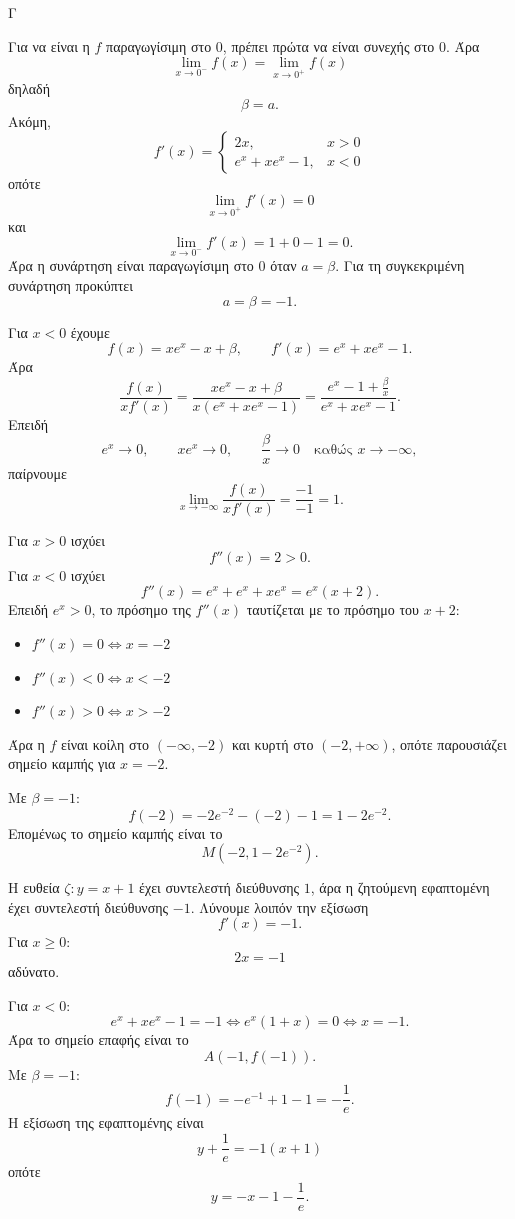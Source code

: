 \begin{thema}{Γ}
\begin{erwthma}
\item Για να είναι η $f$ παραγωγίσιμη στο $0$, πρέπει πρώτα να είναι συνεχής στο $0$.
Άρα
\[
\lim_{x\to 0^-}f(x)=\lim_{x\to 0^+}f(x)
\]
δηλαδή
\[
\beta=a.
\]
Ακόμη,
\[
f'(x)=
\begin{cases}
2x,& x>0\\
e^x+xe^x-1,& x<0
\end{cases}
\]
οπότε
\[
\lim_{x\to 0^+}f'(x)=0
\]
και
\[
\lim_{x\to 0^-}f'(x)=1+0-1=0.
\]
Άρα η συνάρτηση είναι παραγωγίσιμη στο $0$ όταν $a=\beta$.
Για τη συγκεκριμένη συνάρτηση προκύπτει
\[
a=\beta=-1.
\]

\item Για $x<0$ έχουμε
\[
f(x)=xe^x-x+\beta,\qquad f'(x)=e^x+xe^x-1.
\]
Άρα
\[
\frac{f(x)}{xf'(x)}
=
\frac{xe^x-x+\beta}{x(e^x+xe^x-1)}
=
\frac{e^x-1+\frac{\beta}{x}}{e^x+xe^x-1}.
\]
Επειδή
\[
e^x\to 0,\qquad xe^x\to 0,\qquad \frac{\beta}{x}\to 0 \quad \text{καθώς } x\to -\infty,
\]
παίρνουμε
\[
\lim_{x\to -\infty}\frac{f(x)}{xf'(x)}
=
\frac{-1}{-1}=1.
\]

\item Για $x>0$ ισχύει
\[
f''(x)=2>0.
\]
Για $x<0$ ισχύει
\[
f''(x)=e^x+e^x+xe^x=e^x(x+2).
\]
Επειδή $e^x>0$, το πρόσημο της $f''(x)$ ταυτίζεται με το πρόσημο του $x+2$:
\begin{itemize}
\item $f''(x)=0 \Leftrightarrow x=-2$
\item $f''(x)<0 \Leftrightarrow x<-2$
\item $f''(x)>0 \Leftrightarrow x>-2$
\end{itemize}
Άρα η $f$ είναι κοίλη στο $(-\infty,-2)$ και κυρτή στο $(-2,+\infty)$, οπότε παρουσιάζει σημείο καμπής για $x=-2$.

Με $\beta=-1$:
\[
f(-2)=-2e^{-2}-(-2)-1=1-2e^{-2}.
\]
Επομένως το σημείο καμπής είναι το
\[
M\left(-2,1-2e^{-2}\right).
\]

\item Η ευθεία $\zeta:y=x+1$ έχει συντελεστή διεύθυνσης $1$, άρα η ζητούμενη εφαπτομένη έχει συντελεστή διεύθυνσης $-1$.
Λύνουμε λοιπόν την εξίσωση
\[
f'(x)=-1.
\]
Για $x\ge 0$:
\[
2x=-1
\]
αδύνατο.

Για $x<0$:
\[
e^x+xe^x-1=-1 \Leftrightarrow e^x(1+x)=0 \Leftrightarrow x=-1.
\]
Άρα το σημείο επαφής είναι το
\[
A\left(-1,f(-1)\right).
\]
Με $\beta=-1$:
\[
f(-1)=-e^{-1}+1-1=-\frac{1}{e}.
\]
Η εξίσωση της εφαπτομένης είναι
\[
y+\frac{1}{e}=-1(x+1)
\]
οπότε
\[
y=-x-1-\frac{1}{e}.
\]
\end{erwthma}
\end{thema}
